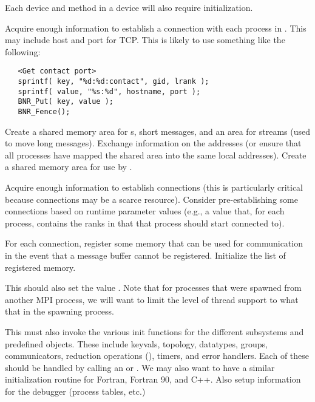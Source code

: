 \documentclass{article}
\begin{document}
\begin{adi3}
Each device and method in a device will also require initialization.  
\begin{tcp}
Acquire enough information to establish a connection with each process
in .  This may include host and port for
TCP.  This is likely to use something like the following:
\begin{verbatim}
   <Get contact port>
   sprintf( key, "%d:%d:contact", gid, lrank );
   sprintf( value, "%s:%d", hostname, port );
   BNR_Put( key, value );
   BNR_Fence();
\end{verbatim}
\end{tcp}
\begin{shmem}
Create a shared memory area for s, short
messages, and an area for streams (used to move long messages).
Exchange information on the addresses (or ensure that all 
processes have mapped the shared area into the same local addresses).
Create a shared memory area for use by .
\end{shmem}
\begin{via}
Acquire enough information to establish connections (this is
particularly critical because connections may be a scarce resource).  
Consider pre-establishing some connections based on runtime parameter
values (e.g., a  value that, for each
process, contains the ranks in  that that
process should start connected to).  

For each connection, register some memory that can be used for
communication in the event that a message buffer cannot be registered.
Initialize the list of registered memory.
\end{via}
\end{adi3}
This should also set the value .
Note that for processes that were spawned from another MPI process, we will
want to limit the level of thread support to what that in the spawning
process. 

This must also invoke the various init functions for the different
subsystems and predefined objects.  These include keyvals, topology, datatypes,
groups, communicators, reduction operations (), timers, and error
handlers.  Each of these should be handled by calling an
 or .  We may also
want to have a similar initialization routine for Fortran, Fortran 90,
and C++.  
Also setup information for the debugger (process tables, etc.)
\end{document}
